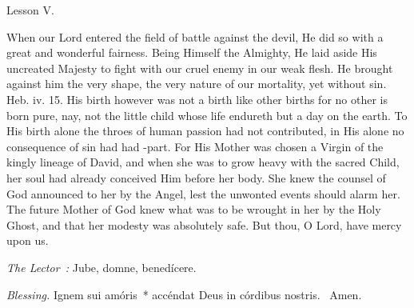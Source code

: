 {  \bigskip{}
  {
    \hfil{Lesson V.}\hfil

    \begin{parcolumns}[rulebetween,colwidths={1=.45\linewidth}]{2}
    {When our Lord entered the field of battle against the devil, He did so with a great and wonderful fairness. Being Himself the Almighty, He laid aside His uncreated Majesty to fight with our cruel enemy in our weak flesh. He brought against him the very shape, the very nature of our mortality, yet without sin. Heb. iv. 15. His birth however was not a birth like other births for no other is born pure, nay, not the little child whose life endureth but a day on the earth. To His birth alone the throes of human passion had not contributed, in His alone no consequence of sin had had -part. For His Mother was chosen a Virgin of the kingly lineage of David, and when she was to grow heavy with the sacred Child, her soul had already conceived Him before her body. She knew the counsel of God announced to her by the Angel, lest the unwonted events should alarm her. The future Mother of God knew what was to be wrought in her by the Holy Ghost, and that her modesty was absolutely safe.
      But thou, O Lord, have mercy upon us.}
    \end{parcolumns}

  }

  {
    \bigskip
    \medskip

    \emph{The Lector~:} Jube, domne, benedícere.

    \emph{Blessing.} Ignem sui amóris~* accéndat Deus in córdibus nostris. \Rbar{}~Amen.
  }

}
